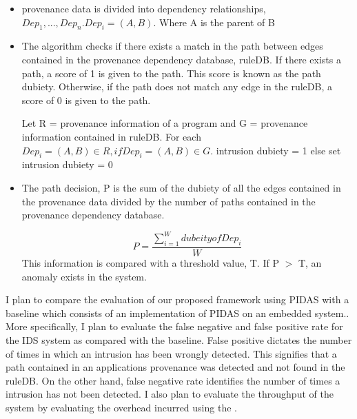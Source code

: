 \begin{itemize}

\item provenance data is divided into dependency relationships, $Dep_1,...,Dep_n. Dep_i =(A, B)$. Where A is the parent of B

\item The algorithm checks if there exists a match in the path between edges contained in the provenance dependency database, ruleDB. If there exists a path, a score of 1 is given to the path. This score is known as the path dubiety. Otherwise, if the path does not match any edge in the ruleDB, a score of 0 is given to the path.

Let R = provenance information of a program and G = provenance information contained in ruleDB. For each $Dep_i = (A, B) \in R, if Dep_i = (A, B) \in G$. intrusion dubiety = 1 else set intrusion dubiety = 0

\item The path decision, P is the sum of the dubiety of all the edges contained in the provenance data divided by the number of paths contained in the provenance dependency database.

 \[P =\frac{\sum\limits_{i=1}^W dubeity of Dep_i }{W} \] This information is compared with a threshold value, T. If P $>$ T, an anomaly exists in the system.

\end{itemize}

I plan to compare the evaluation of our proposed framework using PIDAS with a baseline which consists of an implementation of PIDAS on an embedded system.. More specifically, I plan to evaluate the false negative and false positive rate for the IDS system as compared with the baseline. False positive dictates the number of times in which an intrusion has been wrongly detected. This signifies that a path contained in an applications provenance was detected and not found in the ruleDB. On the other hand, false negative rate identifies the number of times a intrusion has not been detected. I also plan to evaluate the throughput of the system by evaluating the overhead incurred using the .



%
